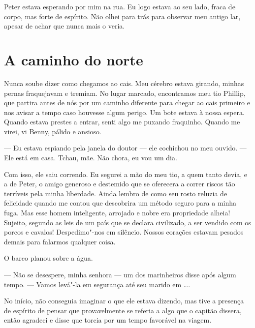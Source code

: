 
Peter estava esperando por mim na rua.
Eu logo estava ao seu lado, fraca de corpo, mas forte de espírito. Não 
olhei para trás para observar meu antigo lar, apesar de achar que nunca
mais o veria.

\chapter*{A caminho do norte}

Nunca soube dizer como chegamos ao
cais. Meu cérebro estava girando, minhas pernas fraquejavam e tremiam.
No lugar marcado, encontramos meu tio Phillip, que partira antes de nós
por um caminho diferente para chegar ao cais primeiro e nos avisar a
tempo caso houvesse algum perigo. Um bote estava à nossa espera. Quando
estava prestes a entrar, senti algo me puxando fraquinho. Quando me
virei, vi Benny, pálido e ansioso.

--- Eu estava espiando pela janela do doutor --- ele cochichou no meu
ouvido. --- Ele está em casa. Tchau, mãe. Não chora, eu vou um dia.

Com isso, ele saiu correndo. Eu segurei a mão do meu tio, a quem tanto
devia, e a de Peter, o amigo generoso e destemido que se oferecera a
correr riscos tão terríveis pela minha liberdade. Ainda lembro de como
seu rosto reluzia de felicidade quando me contou que descobrira um
método seguro para a minha fuga. Mas esse homem inteligente, arrojado e
nobre era propriedade alheia! Sujeito, segundo as leis de um país que se
declara civilizado, a ser vendido com os porcos e cavalos! Despedimo"-nos
em silêncio. Nossos corações estavam pesados demais para falarmos
qualquer coisa.

O barco planou sobre a água.

--- Não se desespere, minha senhora --- um dos marinheiros disse após
algum tempo. --- Vamos levá"-la em segurança até seu marido em \ldots{}.

No início, não conseguia imaginar o que ele estava dizendo, mas tive a
presença de espírito de pensar que provavelmente se referia a algo que o
capitão dissera, então agradeci e disse que torcia por um tempo
favorável na viagem.

